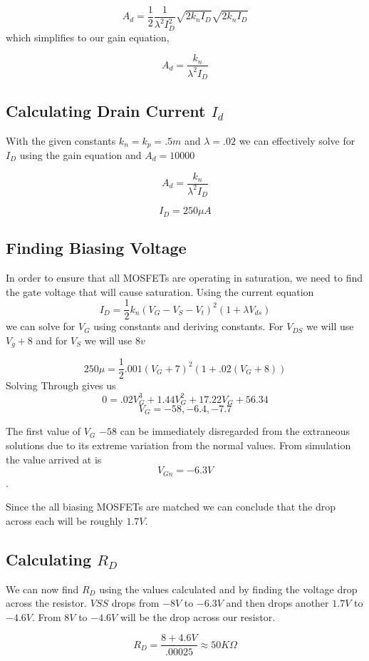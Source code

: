 \documentclass[12pt]{article}
\begin{document}
	
	$$A_d = \frac{1}{2} \frac{1}{\lambda^2 I_D^2} \sqrt{2 k_n I_D} \sqrt{2 k_n I_D}$$
	which simplifies to our gain equation,
	
	$$A_d  = \frac{k_n}{\lambda^2 I_D}$$
	
	\subsection{Calculating Drain Current $I_d$}
	With the given constants $k_n = k_p = .5m$ and $\lambda = .02$ we can effectively solve for $I_D$ using the gain equation and $A_d = 10000$
	
	$$A_d  = \frac{k_n}{\lambda^2 I_D}$$
	
	
	
	$$I_D = 250\mu A$$
	
	\subsection{Finding Biasing Voltage}
	In order to ensure that all MOSFETs are operating in saturation, we need to find the gate voltage that will cause saturation.
	Using the current equation 
	$$I_D = \frac{1}{2} k_n (V_G -V_S - V_t)^2 (1 + \lambda V_{ds})$$
	we can solve for $V_G$ using constants and deriving constants. For $V_{DS}$ we will use $V_g + 8$ and for $V_S$ we will use $8v$
	
	$$250 \mu = \frac{1}{2} .001 (V_G + 7)^2 (1+.02(V_G + 8))$$
	 Solving Through gives us 
	 $$0 = .02V_G^3 + 1.44V_G^2 + 17.22V_G + 56.34$$
	 $$V_G = -58, -6.4 , -7.7$$
	 
	 The first value of $V_G$ $-58$ can be immediately disregarded from the extraneous solutions due to its extreme variation from the normal values. From simulation the value arrived at is $$V_{Gn} = -6.3V$$.
	 
	 Since the all biasing MOSFETs are matched we can conclude that the drop across each will be roughly $1.7V$. 
	 
	
	
	
	
	
	\subsection{Calculating $R_D$}
	We can now find $R_D$ using the values calculated and by finding the voltage drop across the resistor. $VSS$ drops from $-8V$ to $-6.3V$ and then drops another $1.7V$ to $-4.6V$. From $8V$ to $-4.6V$ will be the drop across our resistor.
	
	$$R_D = \frac{8+4.6V}{.00025} \approx 50K \Omega$$
	
\end{document}
